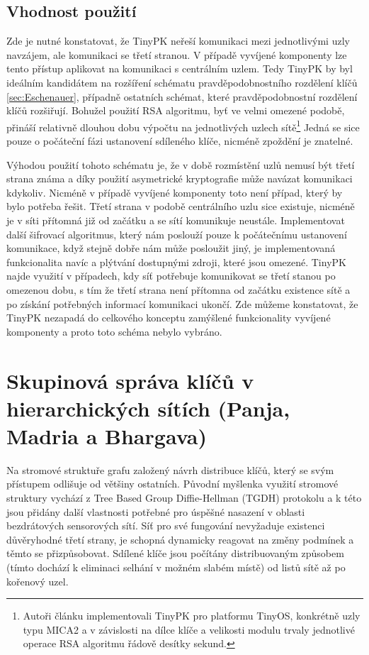 \documentclass[11pt,final,twoside]{fithesis2}
\begin{document}
\subsection{Vhodnost použití}

Zde je nutné konstatovat, že TinyPK neřeší komunikaci mezi jednotlivými uzly navzájem, ale komunikaci se třetí stranou. V případě vyvíjené 
komponenty lze tento přístup aplikovat na komunikaci s centrálním uzlem. Tedy TinyPK by byl ideálním kandidátem na rozšíření schématu pravděpodobnostního
rozdělení klíčů \ref{sec:Eschenauer}, případně ostatních schémat, které pravděpodobnostní rozdělení klíčů rozšiřují.
Bohužel použití RSA algoritmu, byť ve velmi omezené podobě, přináší relativně dlouhou dobu výpočtu na jednotlivých uzlech sítě\footnote{ 
Autoři článku implementovali TinyPK pro platformu TinyOS, konkrétně uzly typu MICA2 \cite{Inc.} a v závislosti na dílce klíče a velikosti modulu
trvaly jednotlivé operace RSA algoritmu řádově desítky sekund.} Jedná se sice pouze o počáteční fázi ustanovení sdíleného klíče, nicméně zpoždění je znatelné.

Výhodou použití tohoto schématu je, že v době rozmístění uzlů nemusí být třetí strana známa a díky použití asymetrické kryptografie může navázat komunikaci kdykoliv.
Nicméně v případě vyvíjené komponenty toto není případ, který by bylo potřeba řešit. Třetí strana v podobě centrálního uzlu sice existuje, nicméně je v síti přítomná již 
od začátku a se sítí komunikuje neustále. Implementovat další šifrovací algoritmus, který nám poslouží pouze k počátečnímu ustanovení komunikace, když stejně dobře 
nám může posloužit jiný, je implementovaná funkcionalita navíc a plýtvání dostupnými zdroji, které jsou omezené. TinyPK najde využití v případech, kdy síť potřebuje komunikovat
se třetí stanou po omezenou dobu, s tím že třetí strana není přítomna od začátku existence sítě a po získání potřebných informací komunikaci ukončí. Zde můžeme konstatovat, že 
TinyPK nezapadá do celkového konceptu zamýšlené funkcionality vyvíjené komponenty a proto toto schéma nebylo vybráno. 

\section{Skupinová správa klíčů v hierarchických sítích (Panja, Madria a Bhargava)}

Na stromové struktuře grafu založený návrh \cite{Panja2007} distribuce klíčů, který se svým přístupem odlišuje od většiny ostatních. Původní myšlenka využití stromové struktury
vychází z Tree Based Group Diffie-Hellman (TGDH) protokolu \cite{Kim2000} a k této jsou přidány další vlastnosti potřebné pro úspěšné nasazení v oblasti bezdrátových sensorových sítí. 
Síť pro své fungování nevyžaduje existenci důvěryhodné třetí strany, je schopná dynamicky reagovat na změny podmínek a těmto se přizpůsobovat. Sdílené klíče jsou počítány distribuovaným 
způsobem (tímto dochází k eliminaci selhání v možném slabém místě) od listů sítě až po kořenový uzel.  
\end{document}
